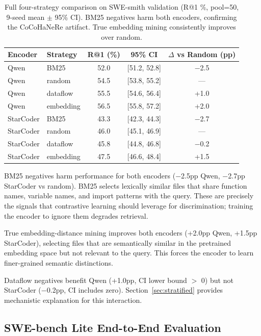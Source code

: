 \documentclass[11pt]{article}
\begin{document}
\begin{table}[h]
\centering
\caption{Full four-strategy comparison on SWE-smith validation (R@1 \%, pool=50, 9-seed mean $\pm$ 95\% CI). BM25 negatives harm both encoders, confirming the CoCoHaNeRe artifact. True embedding mining consistently improves over random.}
\label{tab:main_4strategy}
\begin{tabular}{llccc}
\toprule
\textbf{Encoder} & \textbf{Strategy} & \textbf{R@1 (\%)} & \textbf{95\% CI} & \textbf{$\Delta$ vs Random (pp)} \\
\midrule
Qwen & BM25 & 52.0 & [51.2, 52.8] & $-$2.5 \\
Qwen & random & 54.5 & [53.8, 55.2] & --- \\
Qwen & dataflow & 55.5 & [54.6, 56.4] & +1.0 \\
Qwen & embedding & 56.5 & [55.8, 57.2] & +2.0 \\
\midrule
StarCoder & BM25 & 43.3 & [42.3, 44.3] & $-$2.7 \\
StarCoder & random & 46.0 & [45.1, 46.9] & --- \\
StarCoder & dataflow & 45.8 & [44.8, 46.8] & $-$0.2 \\
StarCoder & embedding & 47.5 & [46.6, 48.4] & +1.5 \\
\bottomrule
\end{tabular}
\end{table}

BM25 negatives harm performance for both encoders ($-$2.5pp Qwen, $-$2.7pp StarCoder vs random).
BM25 selects lexically similar files that share function names, variable names, and import patterns with the query.
These are precisely the signals that contrastive learning should leverage for discrimination; training the encoder to ignore them degrades retrieval.

True embedding-distance mining improves both encoders (+2.0pp Qwen, +1.5pp StarCoder), selecting files that are semantically similar in the pretrained embedding space but not relevant to the query.
This forces the encoder to learn finer-grained semantic distinctions.

Dataflow negatives benefit Qwen (+1.0pp, CI lower bound $>$ 0) but not StarCoder ($-$0.2pp, CI includes zero).
Section~\ref{sec:stratified} provides mechanistic explanation for this interaction.

\subsection{SWE-bench Lite End-to-End Evaluation}
\label{sec:swebench}
\end{document}
